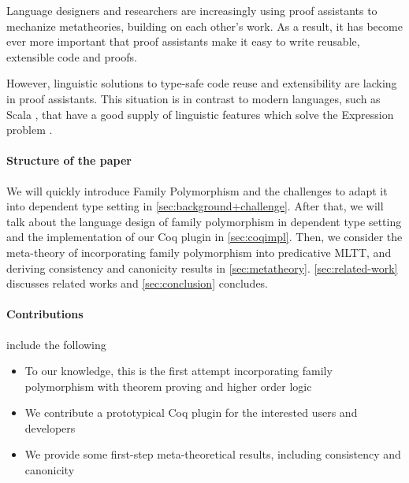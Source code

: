 
Language designers and researchers are increasingly
using proof assistants to mechanize meta\-theories, building on each
other's work.
As a result, it has become ever more important that proof assistants
make it easy to write reusable, extensible code and proofs.

However, linguistic solutions to type-safe code reuse and extensibility
are lacking in proof assistants.
This situation is in contrast to modern languages,
such as Scala \cite{scala-oopsla05}, that have a good supply of
linguistic features which solve the Expression problem \cite{wadler-ep}.

\paragraph{Structure of the paper} 
We will quickly introduce Family Polymorphism and the challenges to adapt it into dependent type setting in \cref{sec:background+challenge}. After that, we will talk about the language design of family polymorphism in dependent type setting and the implementation of our Coq plugin in \cref{sec:coqimpl}. Then, we consider the meta-theory of incorporating family polymorphism into predicative MLTT, and deriving consistency and canonicity results in \cref{sec:metatheory}. \ref{sec:related-work} discusses related works and \ref{sec:conclusion} concludes.


\paragraph{Contributions} include the following
\begin{itemize}
  \item To our knowledge, this is the first attempt incorporating family polymorphism with theorem proving and higher order logic
  \item We contribute a prototypical Coq plugin for the interested users and developers 
  \item We provide some first-step meta-theoretical results, including consistency and canonicity
\end{itemize}
